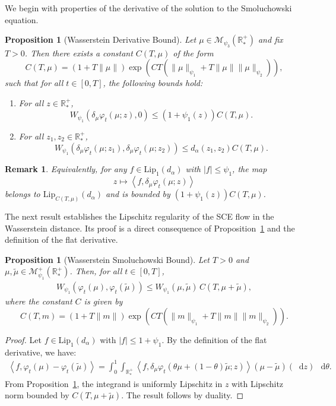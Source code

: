 \documentclass[11pt,a4paper]{article}
\newcommand{\RRP}{\mathbb{R}^+_*}
\newcommand{\MC}{\mathcal{M}}
\newcommand{\brac}[1]{\left\langle#1\right\rangle}
\newcommand{\dd}{\mathop{}\!\mathrm{d}}
\newtheorem{remark}[theorem]{Remark}
\newtheorem{proposition}[theorem]{Proposition}
\begin{document}
We begin with properties of the derivative of the solution to the Smoluchowski equation.

\begin{proposition}[Wasserstein Derivative Bound]\label{prop:wass-derivative}
    Let $\mu \in \MC_{\psi_3}(\RRP)$ and fix $T > 0$. Then there exists a constant $C(T,\mu)$ of the form
    \[
    C(T,\mu) = (1 + T\|\mu\|) \exp\left(C T\left( \|\mu\|_{\psi_1} + T \|\mu\|\|\mu\|_{\psi_2} \right)\right),
    \]
    such that for all $t \in [0, T]$, the following bounds hold:
    \begin{enumerate}
        \item For all $z \in \RRP$,
        \[
        W_{\psi_1}\left( \delta_\mu \varphi_t(\mu; z), 0 \right) \leq (1 + \psi_1(z)) C(T,\mu).
        \]
        \item For all $z_1, z_2 \in \RRP$,
        \[
        W_{\psi_1}\left( \delta_\mu \varphi_t(\mu; z_1), \delta_\mu \varphi_t(\mu; z_2) \right) \leq d_\alpha(z_1, z_2) C(T,\mu).
        \]
    \end{enumerate}
\end{proposition}

\begin{remark}
    Equivalently, for any $f \in \mathrm{Lip}_1(d_\alpha)$ with $|f| \leq \psi_1$, the map
    \[
    z \mapsto \brac{f, \delta_\mu \varphi_t(\mu; z)}
    \]
    belongs to $\mathrm{Lip}_{C(T,\mu)}(d_\alpha)$ and is bounded by $(1 + \psi_1(z)) C(T,\mu)$.
\end{remark}

The next result establishes the Lipschitz regularity of the SCE flow in the Wasserstein distance. Its proof is a direct consequence of Proposition~\ref{prop:wass-derivative} and the definition of the flat derivative.

\begin{proposition}[Wasserstein Smoluchowski Bound]\label{prop:wass-sce}
    Let $T > 0$ and $\mu, \tilde{\mu} \in \MC^+_{\psi_1}(\RRP)$. Then, for all $t \in [0,T]$,
    \begin{align*}
        W_{\psi_1} (\varphi_t(\mu),\varphi_t(\tilde{\mu})) \leq W_{\psi_1} (\mu,\tilde{\mu})\, C(T,\mu + \tilde{\mu}),
    \end{align*}
    where the constant $C$ is given by
    \[
        C(T,m) = (1 + T\|m\|)\exp\left(CT\left(\|m\|_{\psi_1}  +  T\|m\|\|m\|_{\psi_2}\right)\right).
    \]
\end{proposition}

\begin{proof}
    Let $f \in \mathrm{Lip}_1(d_\alpha)$ with $|f| \leq 1 + \psi_1$. By the definition of the flat derivative, we have:
    \begin{align*}
        \brac{f,\varphi_t(\mu)-\varphi_t(\tilde{\mu})} = \int_0^1 \int_{\RRP} \brac{f, \delta_\mu\varphi_t(\theta\mu + (1-\theta)\tilde{\mu};z)} \left(\mu-\tilde{\mu}\right)(\dd z)\, \dd \theta.
    \end{align*}
    From Proposition~\ref{prop:wass-derivative}, the integrand is uniformly Lipschitz in $z$ with Lipschitz norm bounded by $C(T,\mu + \tilde{\mu})$. The result follows by duality.
\end{proof}
\end{document}
